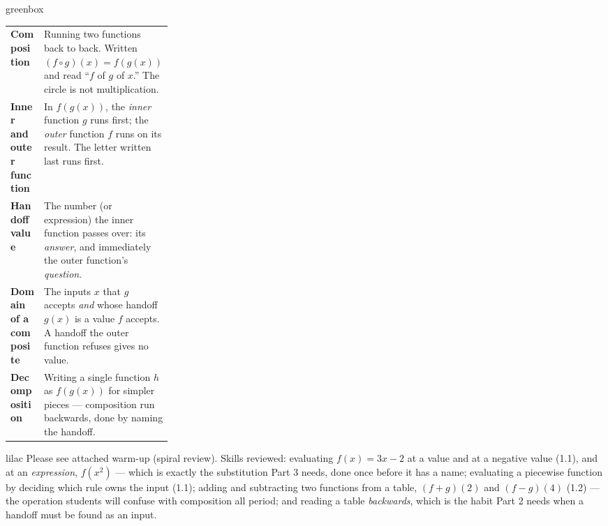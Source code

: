 \documentclass[10pt]{article}
\begin{document}
\begin{skillbox}{greenbox}
\renewcommand{\arraystretch}{1.4}
\begin{tabularx}{\linewidth}{@{} >{\leavevmode\bfseries\color{plum}}p{0.27\linewidth} X @{}}
Composition            & Running two functions back to back. Written $(f \circ g)(x) = f(g(x))$ and read ``$f$ of $g$ of $x$.'' The circle is not multiplication. \\
Inner and outer function & In $f(g(x))$, the \textit{inner} function $g$ runs first; the \textit{outer} function $f$ runs on its result. The letter written last runs first. \\
Handoff value          & The number (or expression) the inner function passes over: its \textit{answer}, and immediately the outer function's \textit{question}. \\
Domain of a composite  & The inputs $x$ that $g$ accepts \textit{and} whose handoff $g(x)$ is a value $f$ accepts. A handoff the outer function refuses gives no value. \\
Decomposition          & Writing a single function $h$ as $f(g(x))$ for simpler pieces --- composition run backwards, done by naming the handoff. \\
\end{tabularx}
\end{skillbox}

\begin{skillbox}{lilac}
    Please see attached warm-up (spiral review).
    Skills reviewed: evaluating $f(x) = 3x - 2$ at a value and at a negative value
    (1.1), and at an \textit{expression}, $f(x^2)$ --- which is exactly the
    substitution Part 3 needs, done once before it has a name;
    evaluating a piecewise function by deciding which rule owns the input (1.1);
    adding and subtracting two functions from a table, $(f+g)(2)$ and $(f-g)(4)$
    (1.2) --- the operation students will confuse with composition all period;
    and reading a table \textit{backwards}, which is the habit Part 2 needs when a
    handoff must be found as an input.
\end{skillbox}
\end{document}
